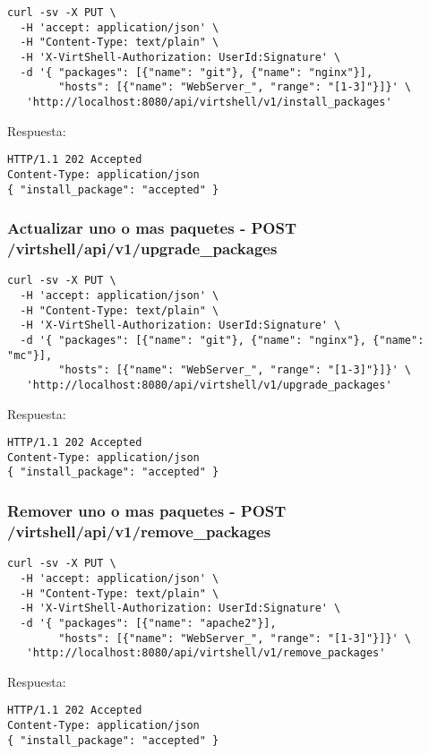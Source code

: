 \begin{lstlisting}[style=json]
curl -sv -X PUT \
  -H 'accept: application/json' \
  -H "Content-Type: text/plain" \
  -H 'X-VirtShell-Authorization: UserId:Signature' \
  -d '{ "packages": [{"name": "git"}, {"name": "nginx"}],
        "hosts": [{"name": "WebServer_", "range": "[1-3]"}]}' \
   'http://localhost:8080/api/virtshell/v1/install_packages'
\end{lstlisting}

\vspace{1cm}
Respuesta:
\vspace{1cm}

\begin{lstlisting}[style=json]
HTTP/1.1 202 Accepted
Content-Type: application/json
{ "install_package": "accepted" }
\end{lstlisting}

\subsubsection{Actualizar uno o mas paquetes - POST /virtshell/api/v1/upgrade\_packages}

\begin{lstlisting}[style=json]
curl -sv -X PUT \
  -H 'accept: application/json' \
  -H "Content-Type: text/plain" \
  -H 'X-VirtShell-Authorization: UserId:Signature' \
  -d '{ "packages": [{"name": "git"}, {"name": "nginx"}, {"name": "mc"}],
        "hosts": [{"name": "WebServer_", "range": "[1-3]"}]}' \
   'http://localhost:8080/api/virtshell/v1/upgrade_packages'
\end{lstlisting}

\vspace{1cm}
Respuesta:
\vspace{1cm}

\begin{lstlisting}[style=json]
HTTP/1.1 202 Accepted
Content-Type: application/json
{ "install_package": "accepted" }
\end{lstlisting}

\subsubsection{Remover uno o mas paquetes - POST /virtshell/api/v1/remove\_packages}

\begin{lstlisting}[style=json]
curl -sv -X PUT \
  -H 'accept: application/json' \
  -H "Content-Type: text/plain" \
  -H 'X-VirtShell-Authorization: UserId:Signature' \
  -d '{ "packages": [{"name": "apache2"}],
        "hosts": [{"name": "WebServer_", "range": "[1-3]"}]}' \
   'http://localhost:8080/api/virtshell/v1/remove_packages'
\end{lstlisting}

\vspace{1cm}
Respuesta:
\vspace{1cm}

\begin{lstlisting}[style=json]
HTTP/1.1 202 Accepted
Content-Type: application/json
{ "install_package": "accepted" }
\end{lstlisting}